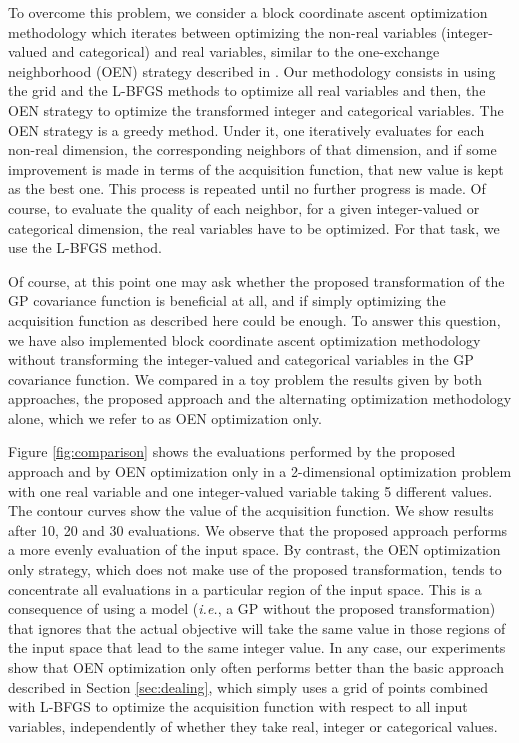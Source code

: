 To overcome this problem, we consider a block coordinate ascent optimization methodology which
iterates between optimizing the non-real variables (integer-valued and categorical) and real variables,
similar to the one-exchange neighborhood (OEN) strategy described in \citep{hutter2009automated,levesque2017bayesian}.
Our methodology consists in using the grid and the L-BFGS methods to optimize all real
variables and then, the OEN strategy to optimize the transformed integer and categorical variables.
The OEN strategy is a greedy method. Under it, one iteratively evaluates for each non-real dimension,
the corresponding neighbors of that dimension, and if some improvement is made in terms of the acquisition function, that new value is kept as the best
one. This process is repeated until no further progress is made. Of course, to evaluate the quality of each neighbor,
for a given integer-valued or categorical dimension, the real variables have to be optimized. For that task, we use the
L-BFGS method.

Of course, at this point one may ask whether the proposed transformation of the GP covariance function is beneficial
at all, and if simply optimizing the acquisition function as described here could be enough. To answer this question,
we have also implemented block coordinate ascent optimization methodology without transforming the integer-valued
and categorical variables in the GP covariance function. We compared in a toy problem the results given by both approaches,
the proposed approach and the alternating optimization methodology alone, which we refer to as OEN optimization only.

Figure \ref{fig:comparison} shows the evaluations performed by the proposed approach and by OEN optimization only
in a 2-dimensional optimization problem with one real variable and one integer-valued variable taking 5 different values.
The contour curves show the value of the acquisition function. We show results after 10, 20 and 30 evaluations.
We observe that the proposed approach performs a more evenly evaluation of the input space. By contrast, the OEN
optimization only strategy, which does not make use of the proposed transformation, tends to concentrate all
evaluations in a particular region of the input space. This is a consequence of using a model (\emph{i.e.}, a GP
without the proposed transformation) that ignores that the actual objective will take the same value in those regions
of the input space that lead to the same integer value. In any case, our experiments  show that OEN optimization 
only often performs better than the basic approach described in Section \ref{sec:dealing},
which simply uses a grid of points combined with L-BFGS to optimize the acquisition function with respect to all input variables,
independently of whether they take real, integer or categorical values.

